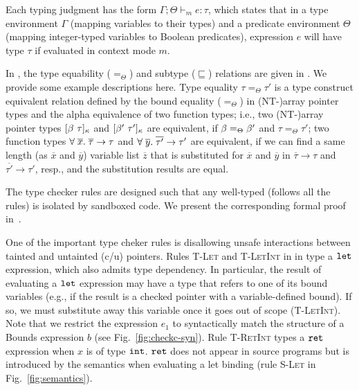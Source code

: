 Each typing judgment has the form $\Gamma;\Theta\vdash_m e : \tau$,
which states that in a type environment $\Gamma$ (mapping variables to
their types) and a predicate environment $\Theta$ (mapping integer-typed
variables to Boolean predicates), expression $e$ will have type $\tau$ if evaluated
in context mode $m$.

In \lang, the type equability ($=_{\Theta}$) and subtype ($\sqsubseteq$) relations are given in .
We provide some example descriptions here.
Type equality $\tau=_{\Theta}\tau'$
is a type construct equivalent relation defined by the bound equality ($=_{\Theta}$) in (NT-)array pointer types
and the alpha equivalence of two function types;
i.e., two (NT-)array pointer types $[{\beta}~{\tau}]_{\kappa} $ and $ [{\beta'}~{\tau'}]_{\kappa}$ are equivalent, if 
$\beta =_{\Theta} \beta'$ and $\tau=_{\Theta}\tau'$; two function types 
$\forall \;\overline{x}.\;{\overline{\tau}}\to\tau $ and $ \forall \;\overline{y}.\;{\overline{\tau'}}\to\tau'$
are equivalent, if we can find a same length (as $\overline{x}$ and $\overline{y}$) variable list $\overline{z}$ that is substituted for $\overline{x}$ and $\overline{y}$ in $\overline{\tau} \to {\tau}$ and $\overline{\tau'} \to {\tau'}$, resp.,
and the substitution results are equal.


The type checker rules are designed such that any well-typed (\ie follows all the rules) is isolated by sandboxed code. We present the corresponding formal proof in~\apdx{}.

One of the important type cheker rules is disallowing unsafe interactions between tainted and untainted (c/u) pointers.
%
Rules \textsc{T-Let} and \textsc{T-LetInt} in in  type a $\mathtt{let}$ expression, which also admits
type dependency. 
In particular, the result of evaluating a $\mathtt{let}$ expression
may have a type that refers to one of its bound variables (e.g., if
the result is a checked pointer with a variable-defined bound). 
If so, we must substitute away this variable once it goes out of scope (\textsc{T-LetInt}). 
Note that we restrict the expression $e_1$ to syntactically match the
structure of a Bounds expression $b$ (see Fig.~\ref{fig:checkc-syn}).
Rule \textsc{T-RetInt} types a $\mathtt{ret}$ expression when $x$ is of type $\mathtt{int}$.
$\mathtt{ret}$ does not appear in source programs but is introduced by the semantics when
evaluating a let binding (rule \textsc{S-Let} in
Fig.~\ref{fig:semantics}). 

